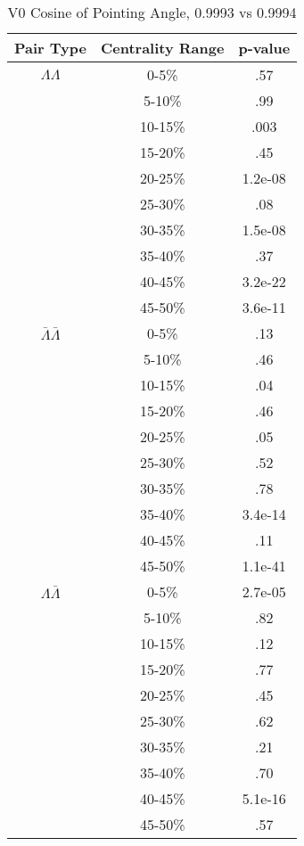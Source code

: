 \begin{table}
\begin{minipage}{18pc}
\caption {V0 Cosine of Pointing Angle, 0.9993 vs 0.9994} \label{tab:V0CosPointingPvalueTests9993vs9994}
\begin{center}
\begin{tabular}{| c | c | c |}
  \hline                       
  Pair Type & Centrality Range & p-value \\
  \hline
  $\Lambda\Lambda$ & 0-5\% & .57 \\
   & 5-10\%  & .99 \\
   & 10-15\% & .003 \\
   & 15-20\% & .45 \\
   & 20-25\% & 1.2e-08 \\
   & 25-30\% & .08 \\
   & 30-35\% & 1.5e-08 \\
   & 35-40\% & .37 \\
   & 40-45\% & 3.2e-22 \\
   & 45-50\% & 3.6e-11 \\
   \hline
  $\bar{\Lambda}\bar{\Lambda}$ &  0-5\% & .13 \\
   & 5-10\% & .46 \\
   & 10-15\% & .04 \\
   & 15-20\% & .46 \\
   & 20-25\% & .05 \\
   & 25-30\% & .52 \\
   & 30-35\% & .78 \\
   & 35-40\% & 3.4e-14 \\
   & 40-45\% & .11 \\
   & 45-50\% & 1.1e-41 \\
   \hline
  $\Lambda\bar{\Lambda}$ &  0-5\% & 2.7e-05 \\
   & 5-10\% & .82 \\
   & 10-15\% & .12 \\
   & 15-20\% & .77 \\
   & 20-25\% & .45 \\
   & 25-30\% & .62 \\
   & 30-35\% & .21 \\
   & 35-40\% & .70 \\
   & 40-45\% & 5.1e-16 \\
   & 45-50\% & .57 \\
  \hline  
\end{tabular}
\end{center}
\end{minipage}
\end{table}

